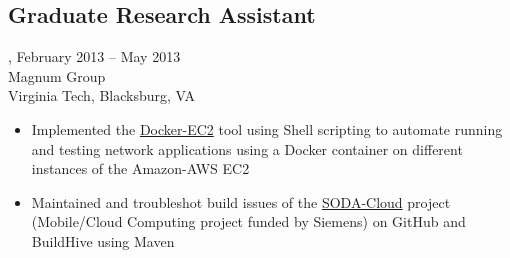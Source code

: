 \subsection{Graduate Research Assistant}, February 2013 -- May 2013\\
Magnum Group
\\
Virginia Tech, Blacksburg, VA
\begin{itemize}
\item Implemented the \href{https://github.com/amrabed/docker-ec2}{Docker-EC2} tool using Shell scripting to automate running and testing network applications using a Docker container on different instances of the Amazon-AWS EC2
\item Maintained and troubleshot build issues of the \href{https://github.com/VT-Magnum-Research/sodacloud}{SODA-Cloud} project (Mobile/Cloud Computing project funded by Siemens) on GitHub and BuildHive using Maven
\end{itemize}
